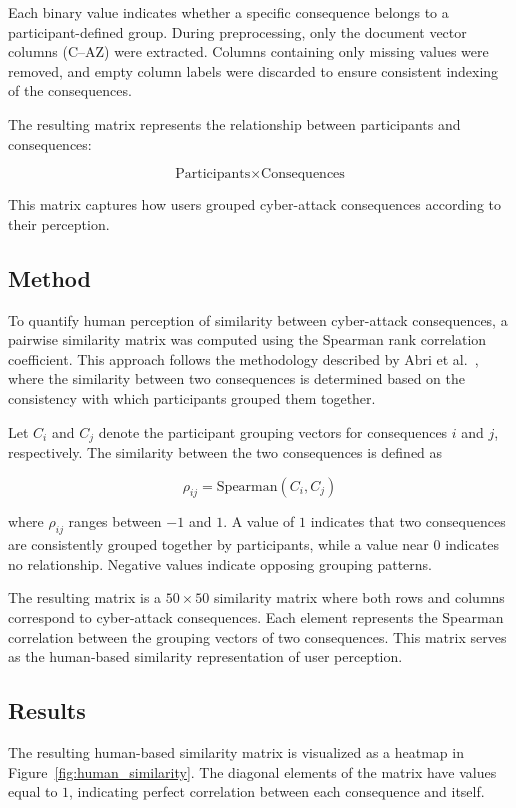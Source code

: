 \documentclass[conference]{IEEEtran}
\begin{document}
Each binary value indicates whether a specific consequence belongs to a participant-defined group. During preprocessing, only the document vector columns (C--AZ) were extracted. Columns containing only missing values were removed, and empty column labels were discarded to ensure consistent indexing of the consequences.

The resulting matrix represents the relationship between participants and consequences:

\[
\text{Participants} \times \text{Consequences}
\]

This matrix captures how users grouped cyber-attack consequences according to their perception.

\subsection{Method}

To quantify human perception of similarity between cyber-attack consequences, a pairwise similarity matrix was computed using the Spearman rank correlation coefficient. This approach follows the methodology described by Abri et al.~\cite{abri2021explainableusers}, where the similarity between two consequences is determined based on the consistency with which participants grouped them together.

Let $C_i$ and $C_j$ denote the participant grouping vectors for consequences $i$ and $j$, respectively. The similarity between the two consequences is defined as

\[
\rho_{ij} = \text{Spearman}(C_i, C_j)
\]

where $\rho_{ij}$ ranges between $-1$ and $1$. A value of $1$ indicates that two consequences are consistently grouped together by participants, while a value near $0$ indicates no relationship. Negative values indicate opposing grouping patterns.

The resulting matrix is a $50 \times 50$ similarity matrix where both rows and columns correspond to cyber-attack consequences. Each element represents the Spearman correlation between the grouping vectors of two consequences. This matrix serves as the human-based similarity representation of user perception.

\subsection{Results}

The resulting human-based similarity matrix is visualized as a heatmap in Figure~\ref{fig:human_similarity}. The diagonal elements of the matrix have values equal to $1$, indicating perfect correlation between each consequence and itself.
\end{document}
